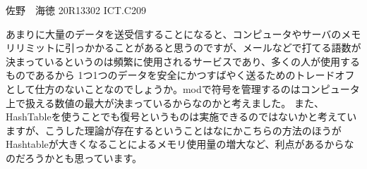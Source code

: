 \documentclass[11pt]{jsarticle}
\begin{document}
佐野　海徳 20R13302 ICT.C209 \\
\par あまりに大量のデータを送受信することになると、コンピュータやサーバのメモリリミットに引っかかることがあると思うのですが、メールなどで打てる語数が決まっているというのは頻繁に使用されるサービスであり、多くの人が使用するものであるから
1つ1つのデータを安全にかつすばやく送るためのトレードオフとして仕方のないことなのでしょうか。modで符号を管理するのはコンピュータ上で扱える数値の最大が決まっているからなのかと考えました。
また、HashTableを使うことでも復号というものは実施できるのではないかと考えていますが、こうした理論が存在するということはなにかこちらの方法のほうがHashtableが大きくなることによるメモリ使用量の増大など、利点があるからなのだろうかとも思っています。
\end{document}
